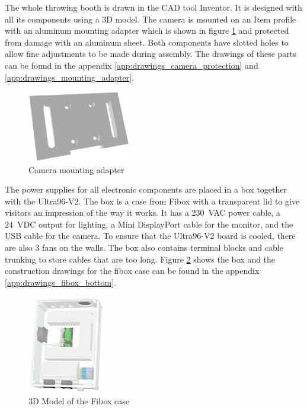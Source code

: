 The whole throwing booth is drawn in the CAD tool Inventor. It is designed with all its components using a 3D model.
The camera is mounted on an Item profile with an aluminum mounting adapter which is shown in figure \ref{fig:mounting_adapter} and protected from damage with an aluminum sheet.
Both components have slotted holes to allow fine adjustments to be made during assembly.
The drawings of these parts can be found in the appendix \ref{app:drawings_camera_protection} and \ref{app:drawings_mounting_adapter}.

\begin{figure}[h]
	\centering
	\includegraphics[width=0.4\textwidth]{graphics/mounting_adapter.png}
	\caption{Camera mounting adapter}
	\label{fig:mounting_adapter}
\end{figure}

The power supplies for all electronic components are placed in a box together with the Ultra96-V2.
The box is a case from Fibox with a transparent lid to give visitors an impression of the way it works.
It has a \SI{230}{VAC} power cable, a \SI{24}{VDC} output for lighting, a Mini DisplayPort cable for the monitor, and the USB cable for the camera.
To ensure that the Ultra96-V2 board is cooled, there are also 3 fans on the walls.
The box also contains terminal blocks and cable trunking to store cables that are too long.
Figure \ref{fig:fibox3d} shows the box and the construction drawings for the fibox case can be found in the appendix \ref{app:drawings_fibox_bottom}.

\begin{figure}[h]
	\centering
	\includegraphics[width=0.3\textwidth]{graphics/case.png}
	\caption{3D Model of the Fibox case}
	\label{fig:fibox3d}
\end{figure}